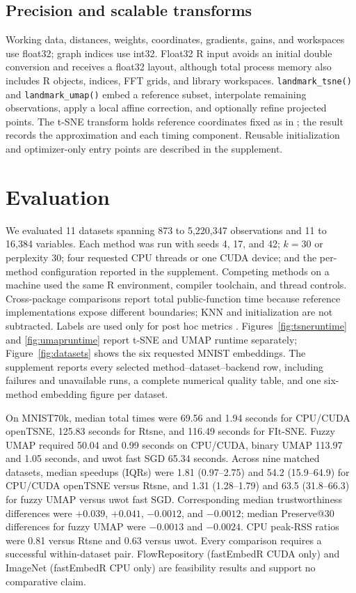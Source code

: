 \documentclass[twoside,11pt]{article}
\begin{document}
\subsection{Precision and scalable transforms}

Working data, distances, weights, coordinates, gradients, gains, and workspaces use float32; graph indices use int32. Float32 R input avoids an initial double conversion and receives a float32 layout, although total process memory also includes R objects, indices, FFT grids, and library workspaces. \texttt{landmark\_tsne()} and \texttt{landmark\_umap()} embed a reference subset, interpolate remaining observations, apply a local affine correction, and optionally refine projected points. The t-SNE transform holds reference coordinates fixed as in \citet{policar2021}; the result records the approximation and each timing component. Reusable initialization and optimizer-only entry points are described in the supplement.

\section{Evaluation}

We evaluated 11 datasets spanning 873 to 5,220,347 observations and 11 to 16,384 variables. Each method was run with seeds 4, 17, and 42; $k=30$ or perplexity 30; four requested CPU threads or one CUDA device; and the per-method configuration reported in the supplement. Competing methods on a machine used the same R environment, compiler toolchain, and thread controls. Cross-package comparisons report total public-function time because reference implementations expose different boundaries; KNN and initialization are not subtracted. Labels are used only for post hoc metrics \citep{venna2001,rousseeuw1987}. Figures~\ref{fig:tsneruntime} and \ref{fig:umapruntime} report t-SNE and UMAP runtime separately; Figure~\ref{fig:datasets} shows the six requested MNIST embeddings. The supplement reports every selected method--dataset--backend row, including failures and unavailable runs, a complete numerical quality table, and one six-method embedding figure per dataset.

On MNIST70k, median total times were 69.56 and 1.94 seconds for CPU/CUDA openTSNE, 125.83 seconds for Rtsne, and 116.49 seconds for FIt-SNE. Fuzzy UMAP required 50.04 and 0.99 seconds on CPU/CUDA, binary UMAP 113.97 and 1.05 seconds, and uwot fast SGD 65.34 seconds. Across nine matched datasets, median speedups (IQRs) were 1.81 (0.97--2.75) and 54.2 (15.9--64.9) for CPU/CUDA openTSNE versus Rtsne, and 1.31 (1.28--1.79) and 63.5 (31.8--66.3) for fuzzy UMAP versus uwot fast SGD. Corresponding median trustworthiness differences were $+0.039$, $+0.041$, $-0.0012$, and $-0.0012$; median Preserve@30 differences for fuzzy UMAP were $-0.0013$ and $-0.0024$. CPU peak-RSS ratios were 0.81 versus Rtsne and 0.63 versus uwot. Every comparison requires a successful within-dataset pair. FlowRepository (fastEmbedR CUDA only) and ImageNet (fastEmbedR CPU only) are feasibility results and support no comparative claim.
\end{document}

